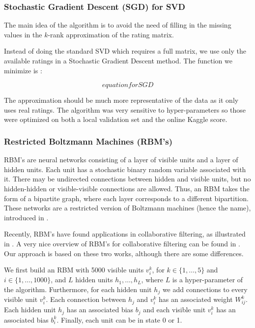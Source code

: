 \documentclass[10pt,conference,compsocconf]{IEEEtran}
\begin{document}
\subsubsection*{\textbf{Stochastic Gradient Descent (SGD) for SVD}} The main idea of the algorithm is to avoid the need of filling in the missing values in the $k$-rank approximation of the rating matrix. 

Instead of doing the standard SVD which requires a full matrix, we use only the available ratings in a Stochastic Gradient Descent method. The function we minimize is :

\begin{equation}
equation for SGD
\end{equation}

The approximation should be much more representative of the data as it only uses real ratings. The algorithm was very sensitive to hyper-parameters so those were optimized on both a local validation set and the online Kaggle score. 

\subsubsection*{\textbf{Restricted Boltzmann Machines (RBM's)}}

RBM's are neural networks consisting of a layer of visible units and a layer of hidden units. Each unit has a stochastic binary random variable associated with it. There may be undirected connections between hidden and visible units, but no hidden-hidden or visible-visible connections are allowed. Thus, an RBM takes the form of a bipartite graph, where each layer corresponds to a different bipartition. These networks are a restricted version of Boltzmann machines (hence the name), introduced in \cite{AHS85}.

Recently, RBM's have found applications in collaborative filtering, as illustrated in \cite{SMH07}. A very nice overview of RBM's for collaborative filtering can be found in \cite{L10}. Our approach is based on these two works, although there are some differences.

We first build an RBM with 5000 visible units $v^k_i$, for $k\in\{1,\dots,5\}$ and $i\in\{1,\dots,1000\}$, and $L$ hidden units $h_1,\dots, h_L$, where $L$ is a hyper-parameter of the algorithm. Furthermore, for each hidden unit $h_j$ we add connections to every visible unit $v^k_i$. Each connection between $h_j$ and $v^k_i$ has an associated weight $W^k_{ij}$. Each hidden unit $h_j$ has an associated bias $b_j$ and each visible unit $v^k_i$ has an associated bias $b^k_i$. Finally, each unit can be in state 0 or 1.
\end{document}

